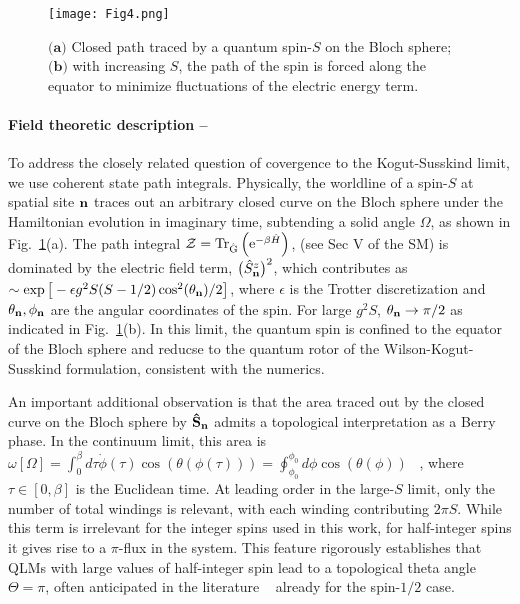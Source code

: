 \documentclass[aps,prl,reprint,twocolumn,superscriptaddress,floatfix,nofootinbib]{revtex4-1}
\begin{document}
	
	\begin{figure}[!tbh]
		\texttt{[image: Fig4.png]}
		\caption{$\textbf{(a)}$ Closed path traced by a quantum spin-$S$ on the Bloch sphere;~$\textbf{(b)}$ with increasing $S$, the path of the spin is forced along the equator to minimize fluctuations of the electric energy term.}
		\label{fig:path}
	\end{figure}
	
	\paragraph{Field theoretic description --}
	To address the closely related question of covergence to the Kogut-Susskind limit, we use coherent state path integrals. Physically, the worldline of a spin-$S$ at spatial site ${\bf n}$ traces out an arbitrary closed curve on the Bloch sphere under the Hamiltonian evolution in imaginary time, subtending a solid angle $\Omega$, as shown in Fig.~\ref{fig:path}(a). The path integral ${\cal{Z}} = \text{Tr}_{\rm \hat{G}} \left( \text{e}^{-\beta \hat{H}}\right)$, (see Sec V of the SM) is dominated by the electric field term, $\big(\hat{S}^z_{{\bf n}}\big)^2$, which contributes as $\sim \exp\big[ -\epsilon g^2 S (S-1/2) \cos^2(\theta_{{\bf n}}) /2\big]$, where $\epsilon$ is the Trotter discretization and $\theta_{\bf n}, \phi_{\bf n}$ are the angular coordinates of the spin. For large $g^2 S$, $\theta_{{\bf n}} \rightarrow \pi/2$ as indicated in Fig.~\ref{fig:path}(b). In this limit, the quantum spin is confined to the equator of the Bloch sphere and reducse to the quantum rotor of the Wilson-Kogut-Susskind formulation, consistent with the numerics.
	
	An important additional observation is that the area traced out by the closed curve on the Bloch sphere by ${\bf \hat{S}_n}$ admits a topological interpretation as a Berry phase. In the continuum limit, this area is $\omega [\Omega] = \int_{0}^{\beta} d\tau \dot{\phi} (\tau) \cos(\theta (\phi(\tau))) = \oint_{\phi_0}^{\phi_0} d \phi \cos (\theta (\phi))$ ~\cite{Berry1984}, where $\tau \in [0,\beta]$ is the Euclidean time. At leading order in the large-$S$ limit, only the number of total windings is relevant, with each winding contributing $2 \pi S$. While this term is irrelevant for the integer spins used in this work, for half-integer spins it gives rise to a $\pi$-flux in the system. This feature rigorously establishes that QLMs with large values of half-integer spin lead to a topological theta angle $\Theta=\pi$, often anticipated in the literature ~\cite{Banerjee2012pg, Hauke_2013, surace2020lattice, yang2020observation} already for the spin-$1/2$ case.
	
\end{document}

